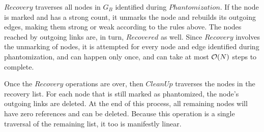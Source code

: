 \begin{proofs}
$Recovery$ traverses all nodes in $G_B$ identified during
$Phantomization$. If the node is marked and has a strong count, it unmarks
the node and rebuilds its outgoing edges, making them strong or weak according to
the rules above. The nodes reached by outgoing links are, in turn,
$Recovered$ as well. Since $Recovery$ involves the unmarking of nodes, it is
attempted for every node and edge identified during phantomization, and can
happen only once, and can take at most ${\cal O}(N)$ steps to complete.

Once the $Recovery$ operations are over, then $CleanUp$ traverses the nodes in
the recovery list. For each node that is still marked as phantomized, the node's
outgoing links are deleted. At the end of this process, all remaining nodes will
have zero references and can be deleted. Because this operation is a single
traversal of the remaining list, it too is manifestly linear.
\end{proofs}

